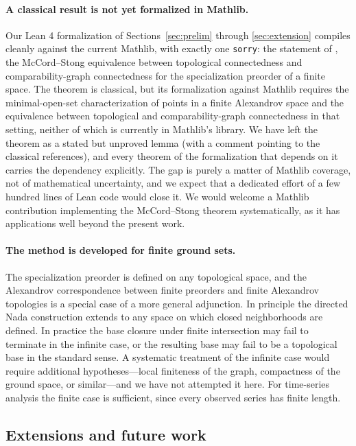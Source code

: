\documentclass[11pt,a4paper]{article}
\theoremstyle{plain}
\theoremstyle{definition}
\begin{document}
\paragraph{A classical result is not yet formalized in Mathlib.}
Our Lean 4 formalization of Sections~\ref{sec:prelim} through
\ref{sec:extension} compiles cleanly against the current Mathlib, with
exactly one \texttt{sorry}: the statement of
, the McCord--Stong equivalence between
topological connectedness and comparability-graph connectedness for
the specialization preorder of a finite space. The theorem is
classical, but its formalization against Mathlib requires the
minimal-open-set characterization of points in a finite Alexandrov
space and the equivalence between topological and comparability-graph
connectedness in that setting, neither of which is currently in
Mathlib's library. We have left the theorem as a stated but unproved
lemma (with a comment pointing to the classical references), and
every theorem of the formalization that depends on it carries the
dependency explicitly. The gap is purely a matter of Mathlib coverage,
not of mathematical uncertainty, and we expect that a dedicated effort
of a few hundred lines of Lean code would close it. We would welcome
a Mathlib contribution implementing the McCord--Stong theorem
systematically, as it has applications well beyond the present work.

\paragraph{The method is developed for finite ground sets.}
The specialization preorder is defined on any topological space, and
the Alexandrov correspondence between finite preorders and finite
Alexandrov topologies is a special case of a more general adjunction.
In principle the directed Nada construction extends to any space on
which closed neighborhoods are defined. In practice the base closure
under finite intersection may fail to terminate in the infinite case,
or the resulting base may fail to be a topological base in the
standard sense. A systematic treatment of the infinite case would
require additional hypotheses---local finiteness of the graph,
compactness of the ground space, or similar---and we have not
attempted it here. For time-series analysis the finite case is
sufficient, since every observed series has finite length.

\subsection{Extensions and future work}\label{subsec:future-work}
\end{document}
